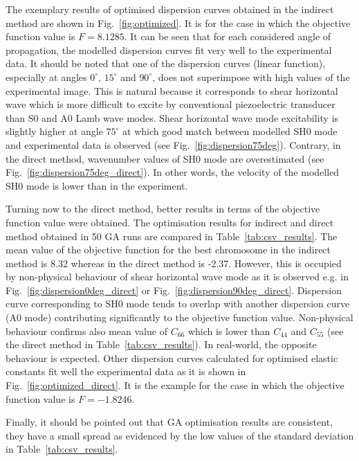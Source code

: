 \documentclass[preprint,12pt]{elsarticle}
\begin{document}
The exemplary results of optimised dispersion curves obtained in the indirect method are shown in Fig.~\ref{fig:optimized}. It is for the case in which the objective function value is $F=8.1285$. It can be seen that for each considered angle of propagation, the modelled dispersion curves fit very well to the experimental data. It should be noted that one of the dispersion curves (linear function), especially at angles $0^{\circ}$, $15^{\circ}$ and $90^{\circ}$, does not superimpose with high values of the experimental image. This is natural because it corresponds to shear horizontal wave which is more difficult to excite by conventional piezoelectric transducer than S0 and A0 Lamb wave modes. Shear horizontal wave mode excitability is slightly higher at angle $75^{\circ}$ at which good match between modelled SH0 mode and experimental data is observed (see Fig.~\ref{fig:dispersion75deg}). Contrary, in the direct method, wavenumber values of SH0 mode are overestimated (see Fig.~\ref{fig:dispersion75deg_direct}). In other words, the velocity of the modelled SH0 mode is lower than in the experiment.

Turning now to the direct method, better results in terms of the objective function value were obtained. The optimisation results for indirect and direct method obtained in 50 GA runs are compared in Table~\ref{tab:csv_results}. The mean value of the objective function for the best chromosome in the indirect method is 8.32 whereas in the direct method is -2.37. However, this is occupied by non-physical behaviour of shear horizontal wave mode as it is observed e.g. in Fig.~\ref{fig:dispersion0deg_direct} or Fig.~\ref{fig:dispersion90deg_direct}. Dispersion curve corresponding to SH0 mode tends to overlap with another dispersion curve (A0 mode) contributing significantly to the objective function value. Non-physical behaviour confirms also mean value of $C_{66}$ which is lower than $C_{44}$ and $C_{55}$ (see the direct method in Table~\ref{tab:csv_results}). In real-world, the opposite behaviour is expected. Other dispersion curves calculated for optimised elastic constants fit well the experimental data as it is shown in Fig.~\ref{fig:optimized_direct}. It is the example for the case in which the objective function value is $F=-1.8246$.

Finally, it should be pointed out that GA optimisation results are consistent, they have a small spread as evidenced by the low values of the standard deviation in Table~\ref{tab:csv_results}. 
\end{document}
